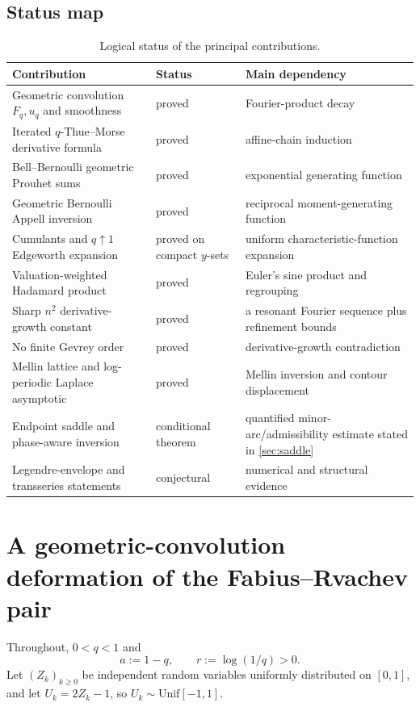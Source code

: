 \documentclass[11pt,oneside]{article}
\theoremstyle{definition}
\theoremstyle{remark}
\begin{document}
\subsection{Status map}

\begin{table}[ht]
\centering
\caption{Logical status of the principal contributions.}
\begin{tabularx}{\textwidth}{@{}p{}p{}X@{}}
\toprule
Contribution & Status & Main dependency \\
\midrule
Geometric convolution $F_q,u_q$ and smoothness & proved & Fourier-product decay \\
Iterated $q$-Thue--Morse derivative formula & proved & affine-chain induction \\
Bell--Bernoulli geometric Prouhet sums & proved & exponential generating function \\
Geometric Bernoulli Appell inversion & proved & reciprocal moment-generating function \\
Cumulants and $q\uparrow1$ Edgeworth expansion & proved on compact $y$-sets & uniform characteristic-function expansion \\
Valuation-weighted Hadamard product & proved & Euler's sine product and regrouping \\
Sharp $n^2$ derivative-growth constant & proved & a resonant Fourier sequence plus refinement bounds \\
No finite Gevrey order & proved & derivative-growth contradiction \\
Mellin lattice and log-periodic Laplace asymptotic & proved & Mellin inversion and contour displacement \\
Endpoint saddle and phase-aware inversion & conditional theorem & quantified minor-arc/admissibility estimate stated in \cref{sec:saddle} \\
Legendre-envelope and transseries statements & conjectural & numerical and structural evidence \\
\bottomrule
\end{tabularx}
\end{table}

\section{A geometric-convolution deformation of the Fabius--Rvachev pair}
\label{sec:qfamily}

Throughout, $0<q<1$ and
\[
 a:=1-q,\qquad r:=\log(1/q)>0.
\]
Let $(Z_k)_{k\ge0}$ be independent random variables uniformly distributed on $[0,1]$,
and let $U_k=2Z_k-1$, so $U_k\sim\mathrm{Unif}[-1,1]$.
\end{document}
